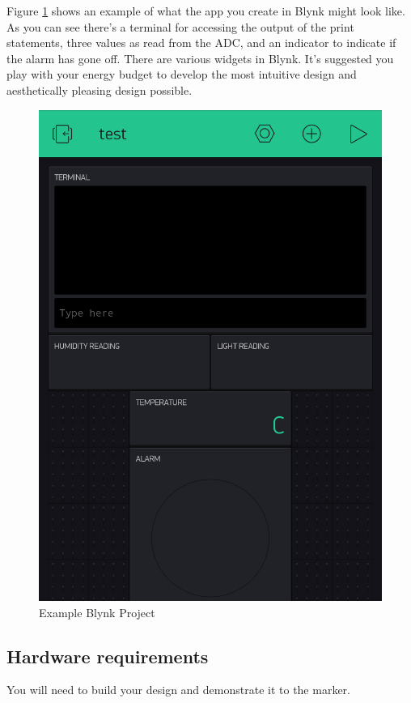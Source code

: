 \begin{multicols}{2}
Figure \ref{fig:blynkexample} shows an example of what the app you create in Blynk might look like.
As you can see there's a terminal for accessing the output of the print statements, three values as read from the ADC, and an indicator to indicate if the alarm has gone off. There are various widgets in Blynk. It's suggested you play with your energy budget to develop the most intuitive design and aesthetically pleasing design possible.
\vfill\null
\columnbreak
\begin{figure}[H]
\centering
\includegraphics[width=0.75\columnwidth]{Figures/blynkexample}
\caption{Example Blynk Project}
\label{fig:blynkexample}
\end{figure}
\end{multicols}


\subsection{Hardware requirements}
You will need to build your design and demonstrate it to the marker.

